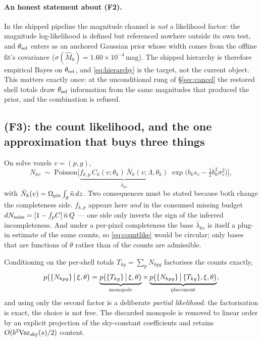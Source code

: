 \documentclass[11pt]{article}
\theoremstyle{definition}
\theoremstyle{remark}
\newcommand{\nbar}{\bar n}
\newcommand{\Var}{\mathrm{Var}}
\begin{document}
\paragraph{An honest statement about (F2).} In the shipped pipeline the magnitude
channel is \emph{not} a likelihood factor: the magnitude log-likelihood is defined
but referenced nowhere outside its own test, and $\theta_{\rm sel}$ enters as an
anchored Gaussian prior whose width comes from the offline fit's covariance
($\sigma(\hat M_0)=1.60\times10^{-4}$\,mag). The shipped hierarchy is therefore
empirical Bayes on $\theta_{\rm sel}$, and \eqref{eq:hierarchy} is the target, not
the current object. This matters exactly once: at the unconditional rung of
\S\ref{sec:cancel} the restored shell totals draw $\theta_{\rm sel}$ information
from the same magnitudes that produced the prior, and the combination is refused.

\subsection{(F3): the count likelihood, and the one approximation that buys three things}
\label{sec:counts}

On solve voxels $v=(p,g)$,
\begin{equation}
  N_{kv}\;\sim\;\mathrm{Poisson}\Big[
  \underbrace{f_{k,p}\,C_k(v;\theta_k)\,\bar N_k(v;\Lambda,\theta_k)}_{\bar\lambda_{kv}}
  \;\exp\!\big(b_ks_v-\tfrac12b_k^2\sigma_v^2\big)\Big],
  \label{eq:countlike}
\end{equation}
with $\bar N_k(v)=\Omega_{\rm pix}\int_g\nbar\,dz$. Two consequences must be stated
because both change the completeness side. $f_{k,p}$ appears here \emph{and} in the
consumed missing budget $dN_{\rm miss}=[1-f_pC]\,\nbar\,Q$ --- one side only inverts
the sign of the inferred incompleteness. And under a per-pixel completeness the
base $\bar\lambda_{kv}$ is itself a plug-in estimate of the same counts, so
\eqref{eq:countlike} would be circular; only bases that are functions of $\theta$
rather than of the counts are admissible.

Conditioning on the per-shell totals $T_{kg}=\sum_pN_{kpg}$ factorises the counts
exactly,
\begin{equation}
  p\big(\{N_{kpg}\}\,\big|\,\xi,\theta\big)
  =\underbrace{p\big(\{T_{kg}\}\,\big|\,\xi,\theta\big)}_{\rm monopole}
  \times\underbrace{p\big(\{N_{kpg}\}\,\big|\,\{T_{kg}\},\xi,\theta\big)}_{\rm placement},
  \label{eq:shellfactor}
\end{equation}
and using only the second factor is a deliberate \emph{partial likelihood}: the
factorisation is exact, the choice is not free. The discarded monopole is removed
to linear order by an explicit projection of the sky-constant coefficients and
retains $O(b^2\Var_{\rm sky}(s)/2)$ content.
\end{document}
